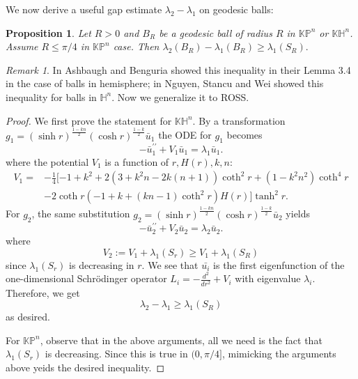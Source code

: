 \documentclass{amsart}
\numberwithin{equation}{section}
\theoremstyle{plain}
\newtheorem{prop}[theorem]{Proposition}
\theoremstyle{definition}
\theoremstyle{remark}
\newtheorem{remark}{Remark}[section]
\def\KK {\mathbb{K}}
\def\HH {\mathbb{H}}
\def\PP {\mathbb{P}}
\begin{document}
We now derive a useful gap estimate $\lambda_2-\lambda_1$ on geodesic balls:

\begin{prop}\label{G''(R) negative}
       Let $R>0$ and $B_R$ be a geodesic ball of radius $R$ in $\KK\PP^n$ or $\KK\HH^n$. Assume $R\leq \pi/4$ in $\KK\PP^n$ case. Then $\lambda_2\left(B_R\right)-\lambda_1\left(B_R\right) \geqslant \lambda_1\left(S_R\right).$ 
\end{prop}
    \begin{remark}
         In \cite{ashbaugh2001sharp} Ashbaugh and Benguria showed this inequality in their Lemma 3.4 in the case of balls in hemisphere; in \cite[Section 2]{wei2022fundamental} Nguyen, Stancu and Wei showed this inequality for balls in $\HH^n$. Now we generalize it to ROSS. 
    \end{remark}
\begin{proof}
    We first prove the statement for $\KK\HH^n$. By a transformation $g_1=(\sinh r)^{\frac{1-k n}{2}}(\cosh r)^{\frac{1-k}{2}} \bar{u}_1$ the ODE for $g_1$ becomes
    \[-\bar{u}_1^{\prime \prime}+V_1 \bar{u}_1=\lambda_1 \bar{u}_1 .\] where the potential $V_1$ is a function of $r, H(r), k, n$:
  \begin{align*}
      V_1 =&-\frac{1}{4}[-1+k^2+2\left(3+k^2 n-2 k(n+1)\right)\coth^2{r} +\left(1-k^2 n^2\right) \operatorname{coth}^4 r \\
           &-2 \operatorname{coth} r\left(-1+k+(k n-1) \operatorname{coth}^2 r\right) H(r)] \tanh ^2 r.
  \end{align*}
For $g_2$, the same substitution  $g_2=(\sinh r)^{\frac{1-k n}{2}}(\cosh r)^{\frac{1-k}{2}} \bar{u}_2$ yields
\[-\bar{u}_2^{\prime \prime}+V_2 \bar{u}_2=\lambda_2 \bar{u}_2 .\] where 
\[V_2 :=V_1+\lambda_1(S_r)\geq V_1 + \lambda_1(S_R)\] since $\lambda_1(S_r)$ is decreasing in $r$. We see that $\bar{u_i}$ is the first eigenfunction of the one-dimensional Schrödinger operator $L_i= -\frac{d^2}{dr^2}+V_i$ with eigenvalue $\lambda_i$.
Therefore, we get\[\lambda_2-\lambda_1 \geqslant \lambda_1\left(S_R\right)\] as desired. 
\par For  $\KK\PP^n$, observe that in the above arguments, all we need is the fact that $\lambda_1(S_r)$ is decreasing. Since this is true in $(0,\pi/4]$, mimicking the arguments above yeids the desired inequality.

  
\end{proof}
\end{document}
